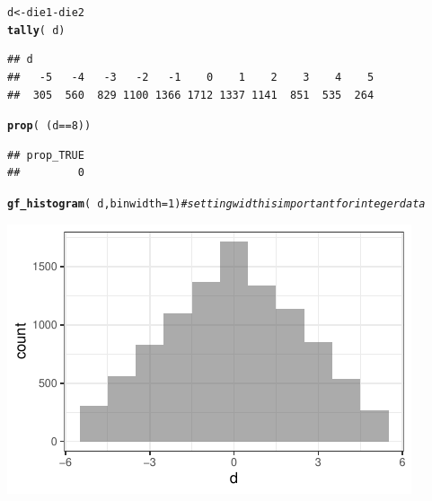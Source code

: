 \documentclass[twoside]{book}\usepackage[]{graphicx}\usepackage[]{xcolor}
\makeatletter
\def\maxwidth{ %
  \ifdim\Gin@nat@width>\linewidth
    \linewidth
  \else
    \Gin@nat@width
  \fi
}
\newcommand{\hlnum}[1]{\textcolor[rgb]{0.686,0.059,0.569}{#1}}%
\newcommand{\hlcom}[1]{\textcolor[rgb]{0.678,0.584,0.686}{\textit{#1}}}%
\newcommand{\hlopt}[1]{\textcolor[rgb]{0,0,0}{#1}}%
\newcommand{\hlstd}[1]{\textcolor[rgb]{0.345,0.345,0.345}{#1}}%
\newcommand{\hlkwb}[1]{\textcolor[rgb]{0.69,0.353,0.396}{#1}}%
\newcommand{\hlkwc}[1]{\textcolor[rgb]{0.333,0.667,0.333}{#1}}%
\newcommand{\hlkwd}[1]{\textcolor[rgb]{0.737,0.353,0.396}{\textbf{#1}}}%
\newenvironment{kframe}{%
 \def\at@end@of@kframe{}%
 \ifinner\ifhmode%
  \def\at@end@of@kframe{\end{minipage}}%
  \begin{minipage}{\columnwidth}%
 \fi\fi%
 \def\FrameCommand##1{\hskip\@totalleftmargin \hskip-\fboxsep
 \colorbox{shadecolor}{##1}\hskip-\fboxsep
     \hskip-\linewidth \hskip-\@totalleftmargin \hskip\columnwidth}%
 \MakeFramed {\advance\hsize-\width
   \@totalleftmargin\z@ \linewidth\hsize
   \@setminipage}}%
 {\par\unskip\endMakeFramed%
 \at@end@of@kframe}
\newenvironment{knitrout}{}{} %
\makeatother
\begin{document}
\begin{solution}
\begin{knitrout}
\color{fgcolor}\begin{kframe}
\begin{alltt}
\hlstd{d} \hlkwb{<-} \hlstd{die1} \hlopt{-} \hlstd{die2}
\hlkwd{tally}\hlstd{(} \hlopt{~} \hlstd{d )}
\end{alltt}
\begin{verbatim}
## d
##   -5   -4   -3   -2   -1    0    1    2    3    4    5 
##  305  560  829 1100 1366 1712 1337 1141  851  535  264
\end{verbatim}
\begin{alltt}
\hlkwd{prop}\hlstd{(} \hlopt{~} \hlstd{(d} \hlopt{==} \hlnum{8}\hlstd{) )}
\end{alltt}
\begin{verbatim}
## prop_TRUE 
##         0
\end{verbatim}
\begin{alltt}
\hlkwd{gf_histogram}\hlstd{(} \hlopt{~} \hlstd{d,} \hlkwc{binwidth} \hlstd{=} \hlnum{1}\hlstd{)}    \hlcom{# setting width is important for integer data}
\end{alltt}
\end{kframe}

{\centering \includegraphics[width=\maxwidth]{figures/fig-unnamed-chunk-46-1} 

}



\end{knitrout}
\end{solution}
\end{document}
